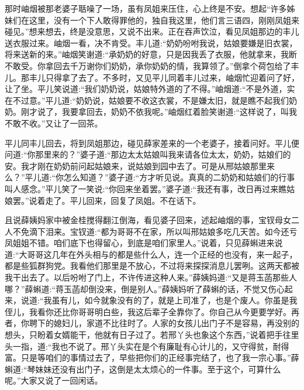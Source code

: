 \begin{parag}
    那时岫烟被那老婆子聒噪了一场，虽有凤姐来压住，心上终是不安。想起“许多姊妹们在这里，没有一个下人敢得罪他的，独自我这里，他们言三语四，刚刚凤姐来碰见。”想来想去，终是没意思，又说不出来。正在吞声饮泣，看见凤姐那边的丰儿送衣服过来。岫烟一看，决不肯受。丰儿道:“奶奶吩咐我说，姑娘要嫌是旧衣裳，将来送新的来。”岫烟笑谢道:“承奶奶的好意，只是因我丢了衣服，他就拿来，我断不敢受。你拿回去千万谢你们奶奶，承你奶奶的情，我算领了。”倒拿个荷包给了丰儿。那丰儿只得拿了去了。不多时，又见平儿同着丰儿过来，岫烟忙迎着问了好，让了坐。平儿笑说道:“我们奶奶说，姑娘特外道的了不得。”岫烟道:“不是外道，实在不过意。”平儿道:“奶奶说，姑娘要不收这衣裳，不是嫌太旧，就是瞧不起我们奶奶。刚才说了，我要拿回去，奶奶不依我呢。”岫烟红着脸笑谢道:“这样说了，叫我不敢不收。”又让了一回茶。
\end{parag}


\begin{parag}
    平儿同丰儿回去，将到凤姐那边，碰见薛家差来的一个老婆子，接着问好。平儿便问道:“你那里来的？”婆子道:“那边太太姑娘叫我来请各位太太，奶奶，姑娘们的安。我才刚在奶奶前问起姑娘来，说姑娘到园中去了。可是从邢姑娘那里来么？”平儿道:“你怎么知道？”婆子道:“方才听见说。真真的二奶奶和姑娘们的行事叫人感念。”平儿笑了一笑说:“你回来坐着罢。”婆子道:“我还有事，改日再过来瞧姑娘罢。”说着走了。平儿回来，回复了凤姐。不在话下。
\end{parag}


\begin{parag}
    且说薛姨妈家中被金桂搅得翻江倒海，看见婆子回来，述起岫烟的事，宝钗母女二人不免滴下泪来。宝钗道:“都为哥哥不在家，所以叫邢姑娘多吃几天苦。如今还亏凤姐姐不错。咱们底下也得留心，到底是咱们家里人。”说着，只见薛蝌进来说道:“大哥哥这几年在外头相与的都是些什么人，连一个正经的也没有，来一起子，都是些狐群狗党。我看他们那里是不放心，不过将来探探消息儿罢咧。这两天都被我干出去了。以后吩咐了门上，不许传进这种人来。”薛姨妈道:“又是蒋玉菡那些人哪？”薛蝌道:“蒋玉菡却倒没来，倒是别人。”薛姨妈听了薛蝌的话，不觉又伤心起来，说道:“我虽有儿，如今就象没有的了，就是上司准了，也是个废人。你虽是我侄儿，我看你还比你哥哥明白些，我这后辈子全靠你了。你自己从今更要学好。再者，你聘下的媳妇儿，家道不比往时了。人家的女孩儿出门子不是容易，再没别的想头，只盼着女婿能干，他就有日子过了。若邢丫头也象这个东西，”说着把手往里头一指，道:“我也不说了。邢丫头实在是个有廉耻有心计儿的，又守得贫，耐得富。只是等咱们的事情过去了，早些把你们的正经事完结了，也了我一宗心事。”薛蝌道:“琴妹妹还没有出门子，这倒是太太烦心的一件事。至于这个，可算什么呢。”大家又说了一回闲话。
\end{parag}


